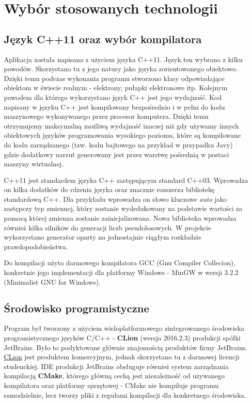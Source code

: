\chapter{Wybór stosowanych technologii}
\section{Język C++11 oraz wybór kompilatora}
Aplikacja została napisana z użyciem języka C++11. Język ten
wybrano z kilku powodów. Skorzystano tu z jego natury jako języka zorientowanego obiektowo. Dzięki temu podczas wykonania programu stworzono klasy odpowiadające obiektom w świecie realnym - elektrony, pułapki elektronowe itp.
Kolejnym powodem dla którego wykorzystano język C++ jest jego wydajność. Kod napisany
w języku C++ jest kompilowany bezpośrednio i w pełni do kodu maszynowego  wykonywanego przez procesor komputera. Dzięki temu
otrzymujemy maksymalną możliwą wydajność inaczej niż gdy używamy innych
obiektowych języków programowania wysokiego poziomu, które są kompilowane do kodu
zarządzanego (tzw. kodu bajtowego na przykład w przypadku Javy) gdzie dodatkowy narzut
generowany jest przez warstwę pośrednią w postaci maszyny wirtualnej. 

C++11 jest standardem języka C++ zastępującym standard C++03. Wprowadza on kilka dodatków do rdzenia języka oraz znacznie rozszerza bibliotekę standardową C++. Dla przykładu wprowadza on słowo kluczowe \textit{auto} jako zastępczy typ zmiennej, który zostanie wydedukowany na podstawie wartości za pomocą której zmienna zostanie zainicjalizowana. Nowa biblioteka wprowadza również kilka silników do generacji liczb pseudolosowych. W projekcie wykorzystano generator oparty na jednostajnie ciągłym rozkładzie prawdopodobieństwa.

Do kompilacji użyto darmowego kompilatora GCC (Gnu Compiler Collecion), konkretnie jego implementacji dla platformy Windows - MinGW w wersji 3.2.2 (Minimalist GNU for Windows).

\section{Środowisko programistyczne}

Program był tworzony z użyciem wieloplatformowego zintegrowanego środowiska programistycznego języków C/C++ - \textbf{CLion} (wersja 2016.2.3) produkcji spółki JetBrains. Było to podyktowane głównie znajomością produktów firmy JetBrains. \href{https://www.jetbrains.com/clion/}{CLion} jest produktem komercyjnym, jednak skorzystano tu z darmowej licencji studenckiej. IDE produkcji JetBrains obsługuje również 	system zarządzania kompilacją \textbf{CMake}, którego główną cechą jest niezależność od używanego kompilatora oraz platformy sprzętowej - CMake nie kompiluje programu samodzielnie, lecz tworzy pliki z regułami kompilacji dla konkretnego środowiska.

